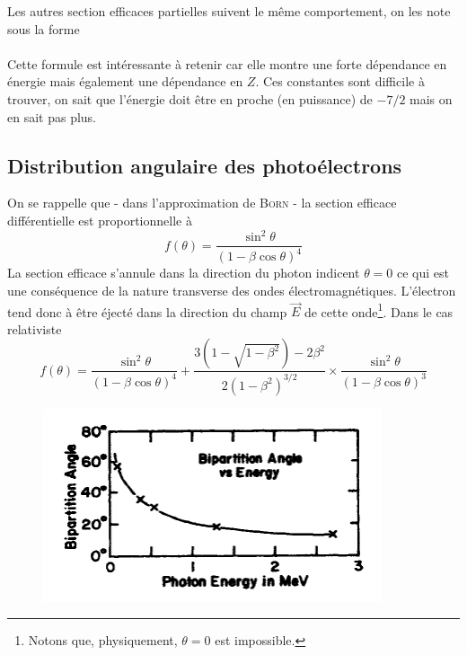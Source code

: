 Les autres section efficaces partielles suivent le même comportement, on les note sous la forme\\

\ \\

Cette formule est intéressante à retenir car elle montre une forte dépendance en énergie mais 
également une dépendance en $Z$. Ces constantes sont difficile à trouver, on sait que l'énergie 
doit être en proche (en puissance) de $-7/2$ mais on en sait pas plus. 


\subsection{Distribution angulaire des photoélectrons}
On se rappelle que - dans l'approximation de \textsc{Born} - la section efficace différentielle
est proportionnelle à
\begin{equation}
f(\theta)=\frac{\sin^2\theta}{(1-\beta\cos\theta)^4}
\end{equation}
La section efficace s'annule dans la direction du photon indicent $\theta=0$ ce qui est une 
conséquence de la nature transverse des ondes électromagnétiques. L'électron tend donc à être
éjecté dans la direction du champ $\vec{E}$ de cette onde\footnote{Notons que, physiquement, 
$\theta=0$ est impossible.}. Dans le cas relativiste
\begin{equation}
f(\theta)=\frac{\sin^2\theta}{(1-\beta\cos\theta)^4}+\frac{3(1-\sqrt{1-\beta^2})-2\beta^2}{2(1-\beta^2)^{3/2}}\times\frac{\sin^2\theta}{(1-\beta\cos\theta)^3}
\end{equation}
\newpage
	\begin{figure}
	\vspace{-3mm}
	\includegraphics[scale=0.5]{ch4/image10}
	\end{figure}

